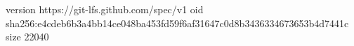 version https://git-lfs.github.com/spec/v1
oid sha256:e4cdeb6b3a4bb14ce048ba453fd59f6af31647c0d8b3436334673653b4d7441c
size 22040
